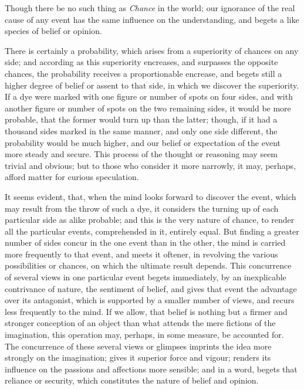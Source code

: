 \documentclass[]{article}
\begin{document}
\begin{sectionbody}

\humeparagraph  Though there be no such thing as \emph{Chance} in the world; our ignorance of the real cause of any event has the same influence on the understanding, and begets a like species of belief or opinion.

\humeparagraph  There is certainly a probability, which arises from a superiority of chances on any side; and according as this superiority encreases, and surpasses the opposite chances, the probability receives a proportionable encrease, and begets still a higher degree of belief or assent to that side, in which we discover the superiority. If a dye were marked with one figure or number of spots on four sides, and with another figure or number of spots on the two remaining sides, it would be more probable, that the former would turn up than the latter; though, if it had a thousand sides marked in the same manner, and only one side different, the probability would be much higher, and our belief or expectation of the event more steady and secure. This process of the thought or reasoning may seem trivial and obvious; but to those who consider it more narrowly, it may, perhaps, afford matter for curious speculation.

\humeparagraph  It seems evident, that, when the mind looks forward to discover the event, which may result from the throw of such a dye, it considers the turning up of each particular side as alike probable; and this is the very nature of chance, to render all the particular events, comprehended in it, entirely equal. But finding a greater number of sides concur in the one event than in the other, the mind is carried more frequently to that event, and meets it oftener, in revolving the various possibilities or chances, on which the ultimate result depends. This concurrence of several views in one particular event begets immediately, by an inexplicable contrivance of nature, the sentiment of belief, and gives that event the advantage over its antagonist, which is supported by a smaller number of views, and recurs less frequently to the mind. If we allow, that belief is nothing but a firmer and stronger conception of an object than what attends the mere fictions of the imagination, this operation may, perhaps, in some measure, be accounted for. The concurrence of these several views or glimpses imprints the idea more strongly on the imagination; gives it superior force and vigour; renders its influence on the passions and affections more sensible; and in a word, begets that reliance or security, which constitutes the nature of belief and opinion.


\end{sectionbody}
\end{document}
